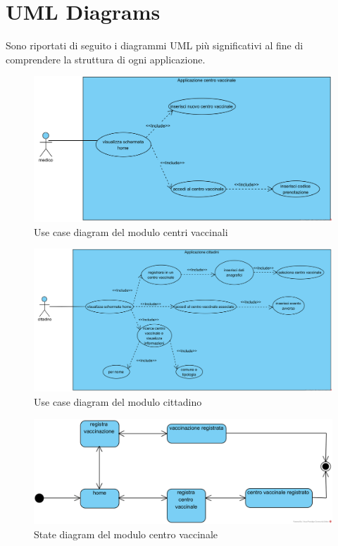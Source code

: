 \section{UML Diagrams}

	Sono riportati di seguito i diagrammi UML più significativi al fine di comprendere la struttura di ogni applicazione.
	

\begin{figure}[h]
	\includegraphics[width=\textwidth]{./img/UseCaseCentriVaccinali}
	\caption{Use case diagram del modulo centri vaccinali}
\end{figure}

\begin{figure}[h]
	\includegraphics[width=\textwidth]{./img/UseCaseCittadino}
	\caption{Use case diagram del modulo cittadino}
\end{figure}

\begin{figure}[h]
	\includegraphics[width=\textwidth]{./img/StateMachineDiagramCentroVaccinale}
	\caption{State diagram del modulo centro vaccinale}
\end{figure}

